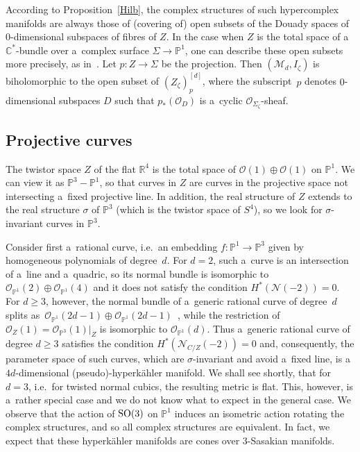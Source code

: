 \documentclass[pdftex]{sigma}
\numberwithin{equation}{section}
\begin{document}
According to Proposition~\ref{Hilb}, the complex structures of such hypercomplex manifolds are always those of (covering
of) open subsets of the Douady spaces of $0$-dimensional subspaces of f\/ibres of $Z$.
In the case when $Z$ is the total space of a~${\mathbb C}^\ast$-bundle over a~complex surface $\Sigma\to
{\mathbb{P}}^1$, one can describe these open subsets more precisely, as in~\cite[Chapter~6]{AH}.
Let $p:Z\to \Sigma$ be the projection.
Then $({\mathcal{M}}_d, I_\zeta)$ is biholomorphic to the open subset of $(Z_\zeta)^{[d]}_p$, where the subscript~$p$
denotes $0$-dimensional subspaces $D$ such that $p_\ast({\mathcal{O}}_D)$ is a~cyclic
${\mathcal{O}}_{\Sigma_\zeta}$-sheaf.

\subsection{Projective curves}

The twistor space $Z$ of the f\/lat ${\mathbb{R}}^4$ is the total space of ${\mathcal{O}}(1)\oplus {\mathcal{O}}(1)$ on
${\mathbb{P}}^1$.
We can view it as ${\mathbb{P}}^3-{\mathbb{P}}^1$, so that curves in $Z$ are curves in the projective space not
intersecting a~f\/ixed projective line.
In addition, the real structure of $Z$ extends to the real structure $\sigma$ of ${\mathbb{P}}^3$ (which is the twistor
space of $S^4$), so we look for $\sigma$-invariant curves in ${\mathbb{P}}^3$.

Consider f\/irst a~rational curve, i.e.\
an embedding $f:{\mathbb{P}}^1\to {\mathbb{P}}^3$ given by homogeneous polynomials of degree~$d$.
For $d=2$, such a~curve is an intersection of a~line and a~quadric, so its normal bundle is isomorphic to
${\mathcal{O}}_{{\mathbb{P}}^1}(2)\oplus {\mathcal{O}}_{{\mathbb{P}}^1}(4)$ and it does not satisfy the condition
$H^\ast({\mathcal{N}}(-2))=0$.
For $d\geq 3$, however, the normal bundle of a~generic rational curve of deg\-ree~$d$ splits as~$
{\mathcal{O}}_{{\mathbb{P}}^1}(2d-1)\oplus {\mathcal{O}}_{{\mathbb{P}}^1}(2d-1)$~\cite{EV,S?}, while the restriction of
${\mathcal{O}}_Z(1)= {\mathcal{O}}_{{\mathbb{P}}^3}(1)|_Z$ is isomorphic to $ {\mathcal{O}}_{{\mathbb{P}}^1}(d)$.
Thus a~generic rational curve of degree $d\geq 3$ satisf\/ies the condition $H^\ast({\mathcal{N}}_{C/Z}(-2))=0$ and,
consequently, the parameter space of such curves, which are $\sigma$-invariant and avoid a~f\/ixed line, is
a~$4d$-dimensional (pseudo)-hyperk\"ahler manifold.
We shall see shortly, that for $d=3$, i.e.\
for twisted normal cubics, the resulting metric is f\/lat.
This, however, is a~rather special case and we do not know what to expect in the general case.
We observe that the action of ${\rm SO}(3)$ on ${\mathbb{P}}^1$ induces an isometric action rotating the complex structures,
and so all complex structures are equivalent.
In fact, we expect that these hyperk\"ahler manifolds are cones over $3$-Sasakian manifolds.
\end{document}
